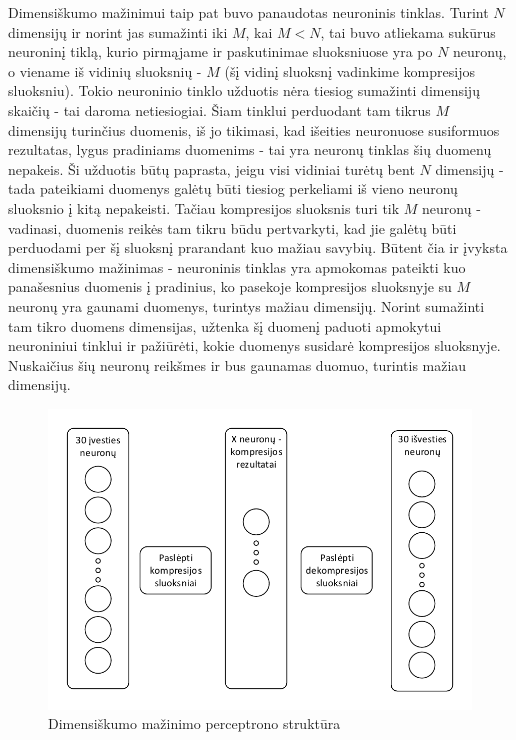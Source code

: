 \documentclass{VUMIFPSbakalaurinis}
\begin{document}
Dimensiškumo mažinimui taip pat buvo panaudotas neuroninis tinklas.
Turint $N$ dimensijų ir norint jas sumažinti iki $M$, kai $M < N$, tai buvo atliekama sukūrus neuroninį tiklą, kurio pirmąjame ir paskutinimae sluoksniuose yra po $N$ neuronų, o viename iš vidinių sluoksnių - $M$ (šį vidinį sluoksnį vadinkime kompresijos sluoksniu).
Tokio neuroninio tinklo užduotis nėra tiesiog sumažinti dimensijų skaičių - tai daroma netiesiogiai.
Šiam tinklui perduodant tam tikrus $M$ dimensijų turinčius duomenis, iš jo tikimasi, kad išeities neuronuose susiformuos rezultatas, lygus pradiniams duomenims - tai yra neuronų tinklas šių duomenų nepakeis.
Ši užduotis būtų paprasta, jeigu visi vidiniai turėtų bent $N$ dimensijų - tada pateikiami duomenys galėtų būti tiesiog perkeliami iš vieno neuronų sluoksnio į kitą nepakeisti.
Tačiau kompresijos sluoksnis turi tik $M$ neuronų - vadinasi, duomenis reikės tam tikru būdu pertvarkyti, kad jie galėtų būti perduodami per šį sluoksnį prarandant kuo mažiau savybių.
Būtent čia ir įvyksta dimensiškumo mažinimas - neuroninis tinklas yra apmokomas pateikti kuo panašesnius duomenis į pradinius, ko pasekoje kompresijos sluoksnyje su $M$ neuronų yra gaunami duomenys, turintys mažiau dimensijų.
Norint sumažinti tam tikro duomens dimensijas, užtenka šį duomenį paduoti apmokytui neuroniniui tinklui ir pažiūrėti, kokie duomenys susidarė kompresijos sluoksnyje.
Nuskaičius šių neuronų reikšmes ir bus gaunamas duomuo, turintis mažiau dimensijų.

\begin{figure}
	\includegraphics[scale=0.75]{diagrams/compression_perceptron}
	\caption{Dimensiškumo mažinimo perceptrono struktūra}
\end{figure}
\end{document}
